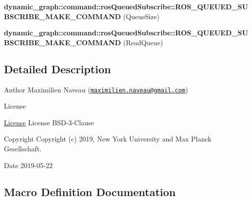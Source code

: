 \begin{DoxyCompactItemize}
\item 
\mbox{\label{ros__queued__subscribe_8hh_a63b0f2aac37b808005de5acf0938a07c}} 
{\bfseries dynamic\+\_\+graph\+::command\+::ros\+Queued\+Subscribe\+::\+R\+O\+S\+\_\+\+Q\+U\+E\+U\+E\+D\+\_\+\+S\+U\+B\+S\+C\+R\+I\+B\+E\+\_\+\+M\+A\+K\+E\+\_\+\+C\+O\+M\+M\+A\+ND} (Queue\+Size)
\item 
\mbox{\label{ros__queued__subscribe_8hh_a08be185dee34f55b3b9fff2c289b1c3d}} 
{\bfseries dynamic\+\_\+graph\+::command\+::ros\+Queued\+Subscribe\+::\+R\+O\+S\+\_\+\+Q\+U\+E\+U\+E\+D\+\_\+\+S\+U\+B\+S\+C\+R\+I\+B\+E\+\_\+\+M\+A\+K\+E\+\_\+\+C\+O\+M\+M\+A\+ND} (Read\+Queue)
\end{DoxyCompactItemize}


\subsection{Detailed Description}
\begin{DoxyAuthor}{Author}
Maximilien Naveau (\href{mailto:maximilien.naveau@gmail.com}{\tt maximilien.\+naveau@gmail.\+com}) 
\end{DoxyAuthor}
\begin{DoxyRefDesc}{License}
\item[\hyperlink{license__license000023}{License}]License B\+S\+D-\/3-\/\+Clause \end{DoxyRefDesc}
\begin{DoxyCopyright}{Copyright}
Copyright (c) 2019, New York University and Max Planck Gesellschaft. 
\end{DoxyCopyright}
\begin{DoxyDate}{Date}
2019-\/05-\/22 
\end{DoxyDate}


\subsection{Macro Definition Documentation}
\mbox{\label{ros__queued__subscribe_8hh_aba91932a5a784635be67fdb33f014fee}} 
